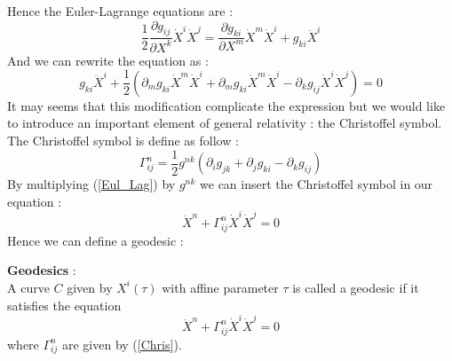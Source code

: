 \documentclass[a4paper,12pt]{article}
\theoremstyle{definition}
\begin{document}
Hence the Euler-Lagrange equations are :
\begin{equation}
	\frac{1}{2}\frac{\partial g_{ij}}{\partial X^k}\dot{X}^i\dot{X}^j=
	\frac{\partial g_{ki}}{\partial X^m}\dot{X}^m\dot{X}^i+g_{ki}\ddot{X}^i
\end{equation}
And we can rewrite the equation as :
\begin{equation}\label{Eul_Lag}
	g_{ki}\ddot{X}^i+\frac{1}{2}(\partial_m g_{ki}\dot{X}^m\dot{X}^i+\partial_m g_{ki}\dot{X}^m\dot{X}^i-\partial_k g_{ij}\dot{X}^i\dot{X}^j)=0
\end{equation}
It may seems that this modification complicate the expression but we would like to introduce an important element of general relativity : the Christoffel symbol.
The Christoffel symbol is define as follow :
\begin{equation}\label{Chris}
	\Gamma^n_{ij}=\frac{1}{2}g^{nk}(\partial_i g_{jk}+\partial_j g_{ki}-\partial_k g_{ij})
\end{equation}
By multiplying (\ref{Eul_Lag}) by $g^{nk}$ we can insert the Christoffel symbol in our equation :
\begin{equation}
	\ddot{X}^n+\Gamma^n_{ij}\dot{X}^i\dot{X}^j=0
\end{equation}
Hence we can define a geodesic :
\begin{definition}
	\textbf{Geodesics} :\\
	A curve $C$ given by $X^i(\tau)$ with affine parameter $\tau$ is called a geodesic if it satisfies the equation
	\begin{equation}\label{Geodesic}
		\ddot{X}^n+\Gamma^n_{ij}\dot{X}^i\dot{X}^j=0
	\end{equation}
	where $\Gamma^n_{ij}$ are given by (\ref{Chris}).
\end{definition}
\end{document}
